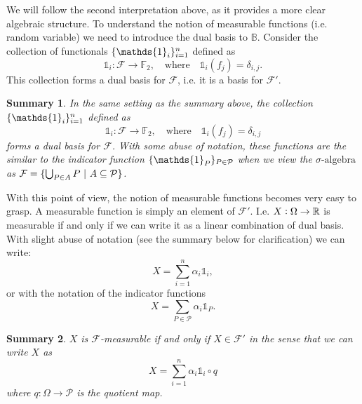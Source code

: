 \documentclass[11pt,a4paper]{article}
\newtheorem*{summary}{Summary}
\theoremstyle{definition}
\begin{document}
	We will follow the second interpretation above, as it provides a more clear algebraic structure. To understand the notion of measurable functions (i.e. random variable) we need to introduce the dual basis to $ \mathbb{B} $. Consider the collection of functionals $ \set{\mathds{1}_i}_{i=1}^n $ defined as
	\[ \mathds{1}_{i}: \mathcal{F} \to \mathbb{F}_2, \quad \text{where} \quad \mathds{1}_{i}(f_j) = \delta_{i,j}. \]
	This collection forms a dual basis for $ \mathcal{F} $, i.e. it is a basis for $ \mathcal{F}' $.
	
	\begin{summary}
		In the same setting as the summary above, the collection  $ \set{\mathds{1}_i}_{i=1}^n $ defined as
		\[ \mathds{1}_{i}: \mathcal{F} \to \mathbb{F}_2, \quad \text{where} \quad \mathds{1}_{i}(f_j) = \delta_{i,j} \]
		forms a dual basis for $ \mathcal{F} $. With some abuse of notation, these functions are the similar to the indicator function $ \set{\mathds{1}_{P}}_{P\in \mathcal{P}} $ when we view the $\sigma\text{-algebra}$ as $ \mathcal{F} = \set{\bigcup_{P\in A} P\ |\ A\subseteq \mathcal{P} } $.
	\end{summary}
	
	With this point of view, the notion of measurable functions becomes very easy to grasp. A measurable function is simply an element of $ \mathcal{F}' $. I.e. $ X:\Omega \to \mathbb{R} $ is measurable if and only if we can write it as a linear combination of dual basis. With slight abuse of notation (see the summary below for clarification) we can write:
	\[ X = \sum_{i=1}^{n} \alpha_i \mathds{1}_{i}, \]
	or with the notation of the indicator functions
	\[ X = \sum_{P\in \mathcal{P}} \alpha_i \mathds{1}_{P}. \] 
	
	
	\begin{summary}
		$ X $ is $ \mathcal{F} $-measurable if and only if $ X \in \mathcal{F}' $ in the sense that we can write $ X $ as
		\[ X = \sum_{i=1}^n \alpha_i \mathds{1}_{i}\circ q \]
		where $ q: \Omega\to \mathcal{P} $ is the quotient map.
	\end{summary}
	
	
	
	
	
	
	
	
	\newpage
	
	
	
	
\end{document}
